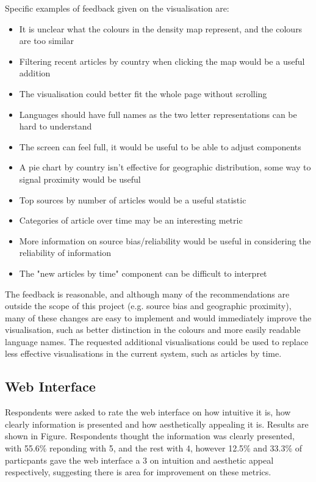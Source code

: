 \documentclass{l4proj}
\begin{document}
Specific examples of feedback given on the visualisation are:
\begin{itemize}
    \item It is unclear what the colours in the density map represent, and the colours are too similar
    \item Filtering recent articles by country when clicking the map would be a useful addition
    \item The visualisation could better fit the whole page without scrolling
    \item Languages should have full names as the two letter representations can be hard to understand
    \item The screen can feel full, it would be useful to be able to adjust components
    \item A pie chart by country isn't effective for geographic distribution, some way to signal proximity would be useful
    \item Top sources by number of articles would be a useful statistic
    \item Categories of article over time may be an interesting metric
    \item More information on source bias/reliability would be useful in considering the reliability of information
    \item The "new articles by time" component can be difficult to interpret
\end{itemize}

The feedback is reasonable, and although many of the recommendations are outside the scope of this project (e.g. source bias and geographic proximity), many of these changes are easy to implement and would immediately improve the visualisation, such as better distinction in the colours and more easily readable language names. The requested additional visualisations could be used to replace less effective visualisations in the current system, such as articles by time.

\subsection{Web Interface}
Respondents were asked to rate the web interface on how intuitive it is, how clearly information is presented and how aesthetically appealing it is. Results are shown in Figure. Respondents thought the information was clearly presented, with 55.6\% reponding with 5, and the rest with 4, however 12.5\% and 33.3\% of particpants gave the web interface a 3 on intuition and aesthetic appeal respectively, suggesting there is area for improvement on these metrics. 
\end{document}
